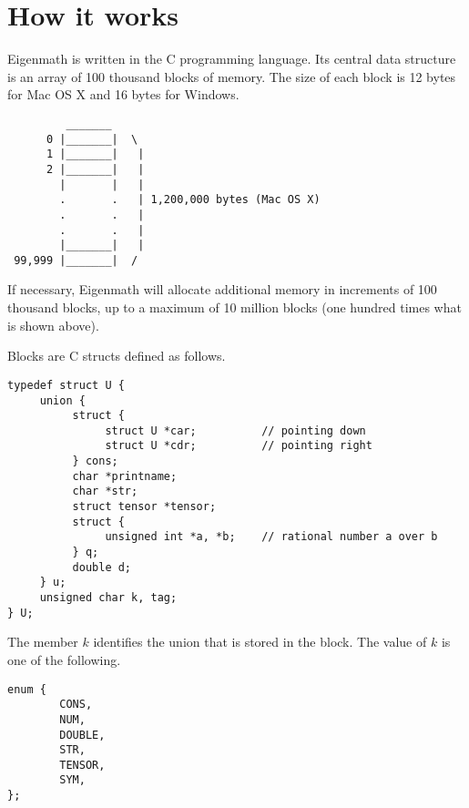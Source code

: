 \chapter{How it works}

Eigenmath is written in the C programming language.
Its central data structure is
an array of 100 thousand blocks of memory.
The size of each block is 12 bytes for Mac OS X
and 16 bytes for Windows.
\begin{verbatim}
         _______
      0 |_______|  \
      1 |_______|   |
      2 |_______|   |
        |       |   |
        .       .   | 1,200,000 bytes (Mac OS X)
        .       .   |
        .       .   |
        |_______|   |
 99,999 |_______|  /
\end{verbatim}

\bigskip
\noindent
If necessary, Eigenmath will allocate additional memory in increments of
100 thousand blocks, up to a maximum of 10 million blocks
(one hundred times what is shown above).


\newpage

\noindent
Blocks are C structs defined as follows.

\medskip
\begin{verbatim}
typedef struct U {
     union {
          struct {
               struct U *car;          // pointing down
               struct U *cdr;          // pointing right
          } cons;
          char *printname;
          char *str;
          struct tensor *tensor;
          struct {
               unsigned int *a, *b;    // rational number a over b
          } q;
          double d;
     } u;
     unsigned char k, tag;
} U;
\end{verbatim}

\medskip
\noindent
The member $k$ identifies the union that is stored in the block.
The value of $k$ is one of the following.

\medskip
\begin{verbatim}
enum {
        CONS,
        NUM,
        DOUBLE,
        STR,
        TENSOR,
        SYM,
};
\end{verbatim}

\newpage

